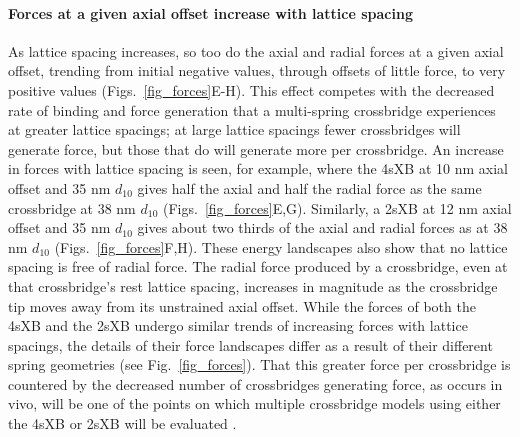 \documentclass[]{article}
\begin{document}
\paragraph{Forces at a given axial offset increase with lattice spacing} %
As lattice spacing increases, so too do the axial and radial forces at a given axial offset, trending from initial negative values, through offsets of little force, to very positive values (Figs.~\ref{fig_forces}E-H). 
This effect competes with the decreased rate of binding and force generation that a multi-spring crossbridge experiences at greater lattice spacings; at large lattice spacings fewer crossbridges will generate force, but those that do will generate more per crossbridge. 
An increase in forces with lattice spacing is seen, for example, where the 4sXB at 10 nm axial offset and 35 nm $d_{10}$ gives half the axial and half the radial force as the same crossbridge at 38 nm $d_{10}$ (Figs.~\ref{fig_forces}E,G). 
Similarly, a 2sXB at 12 nm axial offset and 35 nm $d_{10}$ gives about two thirds of the axial and radial forces as at 38 nm $d_{10}$ (Figs.~\ref{fig_forces}F,H).  
These energy landscapes also show that no lattice spacing is free of radial force.
The radial force produced by a crossbridge, even at that crossbridge's rest lattice spacing, increases in magnitude as the crossbridge tip moves away from its unstrained axial offset. 
While the forces of both the 4sXB and the 2sXB undergo similar trends of increasing forces with lattice spacings, the details of their force landscapes differ as a result of their different spring geometries (see Fig.~\ref{fig_forces}). 
That this greater force per crossbridge is countered by the decreased number of crossbridges generating force, as occurs in vivo, will be one of the points on which multiple crossbridge models using either the 4sXB or 2sXB will be evaluated \citep{Martyn2004}. 
\end{document}
